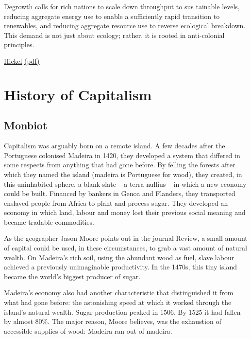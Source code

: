 \documentclass[
]{book}
\begin{document}
Degrowth calls for rich nations to scale down throughput to sus­
tainable levels, reducing aggregate energy use to enable a sufficiently
rapid transition to renewables, and reducing aggregate resource use to
reverse ecological breakdown. This demand is not just about ecology;
rather, it is rooted in anti-colonial principles.

\href{https://www.sciencedirect.com/science/article/pii/S0962629821000640}{Hickel}
\href{pdf/Hickel_2021_Anti-colonial_degrowth.pdf}{(pdf)}

\hypertarget{history-of-capitalism}{%
\chapter{History of Capitalism}\label{history-of-capitalism}}

\hypertarget{monbiot}{%
\section{Monbiot}\label{monbiot}}

Capitalism was arguably born on a remote island. A few decades after the Portuguese colonised Madeira in 1420, they developed a system that differed in some respects from anything that had gone before. By felling the forests after which they named the island (madeira is Portuguese for wood), they created, in this uninhabited sphere, a blank slate -- a terra nullius -- in which a new economy could be built. Financed by bankers in Genoa and Flanders, they transported enslaved people from Africa to plant and process sugar. They developed an economy in which land, labour and money lost their previous social meaning and became tradable commodities.

As the geographer Jason Moore points out in the journal Review, a small amount of capital could be used, in these circumstances, to grab a vast amount of natural wealth. On Madeira's rich soil, using the abundant wood as fuel, slave labour achieved a previously unimaginable productivity. In the 1470s, this tiny island became the world's biggest producer of sugar.

Madeira's economy also had another characteristic that distinguished it from what had gone before: the astonishing speed at which it worked through the island's natural wealth. Sugar production peaked in 1506. By 1525 it had fallen by almost 80\%. The major reason, Moore believes, was the exhaustion of accessible supplies of wood: Madeira ran out of madeira.
\end{document}
